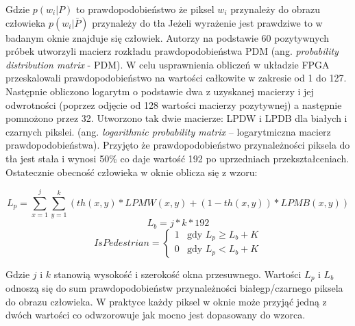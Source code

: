 Gdzie \( p(w_i|P) \) to prawdopodobieństwo że piksel $w_i$ przynależy do obrazu człowieka
\(  p(w_i|\bar{P}) \) przynależy do tła
Jeżeli wyrażenie jest prawdziwe to w badanym oknie znajduje się człowiek. Autorzy na podstawie 60 pozytywnych próbek utworzyli macierz rozkładu prawdopodobieństwa PDM (ang. \textit{probability distribution matrix} - PDM). W celu usprawnienia obliczeń w układzie FPGA przeskalowali prawdopodobieństwo na wartości całkowite w zakresie od 1 do 127. Następnie obliczono logarytm o podstawie dwa z uzyskanej macierzy i jej odwrotności (poprzez odjęcie od 128 wartości macierzy pozytywnej) a następnie pomnożono przez 32. Utworzono tak dwie macierze: LPDW i LPDB dla białych i czarnych pikslei. (ang. \textit{logarithmic probability matrix} – logarytmiczna macierz prawdopodobieństwa). Przyjęto że prawdopodobieństwo przynależności piksela do tła jest stała i wynosi 50\% co daje wartość 192 po uprzedniach przekształceniach. Ostatecznie obecność człowieka w oknie oblicza się z wzoru: 

\begin{equation}\label{equ:Lp}
L_{p} = \sum_{x=1}^{j}\sum_{y=1}^{k}(th(x,y)*LPMW(x,y)+(1-th(x,y))*LPMB(x,y))
\end{equation}
\begin{equation}\label{equ:Lb}
L_{b} = j*k*192
\end{equation}
\begin{equation} \label{equ:ispedistant}
IsPedestrian = \left\{ \begin{array}{ll}
1 & \textrm{gdy $L_{p} 	\geq L_{b} + K$}\\
0 & \textrm{gdy $L_{p}<L_{b} + K$}
\end{array} \right.
\end{equation}

\noindent Gdzie $j$ i $k$ stanowią wysokość i szerokość okna przesuwnego. Wartości $L_p$ i $L_b$ odnoszą się do sum prawdopodobieństw przynależności białegp/czarnego piksela do obrazu człowieka. W praktyce każdy piksel w oknie może przyjąć jedną z dwóch wartości co odwzorowuje jak mocno jest dopasowany do wzorca. 
